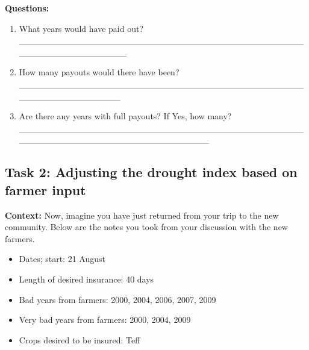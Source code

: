 \documentclass[letterpaper,10pt,english]{sphinxmanual}
\begin{document}
\textbf{Questions:}
\begin{enumerate}
\item {} 
What years would have paid out? \_\_\_\_\_\_\_\_\_\_\_\_\_\_\_\_\_\_\_\_\_\_\_\_\_\_\_\_\_\_\_\_\_\_\_\_\_\_\_\_\_\_\_\_\_\_\_\_\_\_\_\_\_\_\_\_\_\_\_\_\_\_

\item {} 
How many payouts would there have been? \_\_\_\_\_\_\_\_\_\_\_\_\_\_\_\_\_\_\_\_\_\_\_\_\_\_\_\_\_\_\_\_\_\_\_\_\_\_\_\_\_\_\_\_\_\_\_\_\_\_\_\_\_\_\_\_\_\_\_\_\_

\item {} 
Are there any years with full payouts? If Yes, how many? \_\_\_\_\_\_\_\_\_\_\_\_\_\_\_\_\_\_\_\_\_\_\_\_\_\_\_\_\_\_\_\_\_\_\_\_\_\_\_\_\_\_\_\_\_\_\_\_\_\_\_\_\_\_\_\_\_\_\_\_\_\_\_\_\_\_\_\_\_\_\_\_\_\_\_

\end{enumerate}


\subsection{Task 2: Adjusting the drought index based on farmer input}
\label{wiiet/wiiet_usingfarmerinformation_Web:task-2-adjusting-the-drought-index-based-on-farmer-input}
\textbf{Context:} Now, imagine you have just returned from your trip to the new community. Below are the notes you took from your discussion with the new farmers.
\begin{itemize}
\item {} 
Dates; start: 21 August

\item {} 
Length of desired insurance: 40 days

\item {} 
Bad years from farmers: 2000, 2004, 2006, 2007, 2009

\item {} 
Very bad years from farmers: 2000, 2004, 2009

\item {} 
Crops desired to be insured: Teff

\end{itemize}
\end{document}
